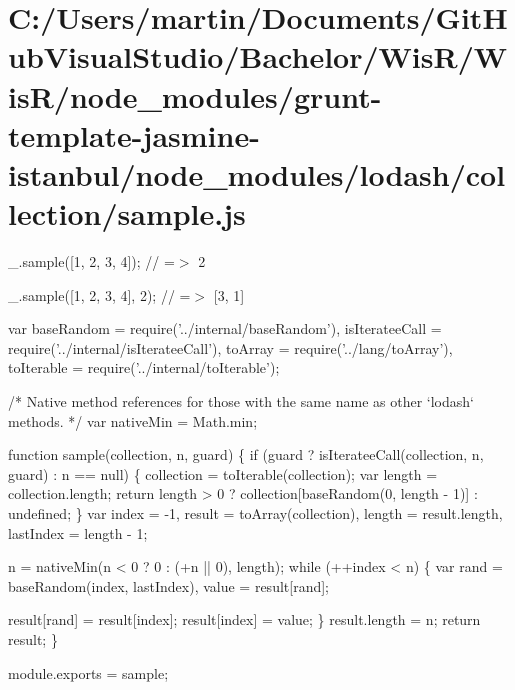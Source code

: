 \hypertarget{_c_1_2_users_2martin_2_documents_2_git_hub_visual_studio_2_bachelor_2_wis_r_2_wis_r_2node_module976fb4be8c54e3aff4b4ab6829a9eef2}{}\section{C\+:/\+Users/martin/\+Documents/\+Git\+Hub\+Visual\+Studio/\+Bachelor/\+Wis\+R/\+Wis\+R/node\+\_\+modules/grunt-\/template-\/jasmine-\/istanbul/node\+\_\+modules/lodash/collection/sample.\+js}
\+\_\+.\+sample(\mbox{[}1, 2, 3, 4\mbox{]}); // =$>$ 2

\+\_\+.\+sample(\mbox{[}1, 2, 3, 4\mbox{]}, 2); // =$>$ \mbox{[}3, 1\mbox{]}


\begin{DoxyCodeInclude}
var baseRandom = require(\textcolor{stringliteral}{'../internal/baseRandom'}),
    isIterateeCall = require(\textcolor{stringliteral}{'../internal/isIterateeCall'}),
    toArray = require(\textcolor{stringliteral}{'../lang/toArray'}),
    toIterable = require(\textcolor{stringliteral}{'../internal/toIterable'});

\textcolor{comment}{/* Native method references for those with the same name as other `lodash` methods. */}
var nativeMin = Math.min;

\textcolor{keyword}{function} sample(collection, n, guard) \{
  \textcolor{keywordflow}{if} (guard ? isIterateeCall(collection, n, guard) : n == null) \{
    collection = toIterable(collection);
    var length = collection.length;
    \textcolor{keywordflow}{return} length > 0 ? collection[baseRandom(0, length - 1)] : undefined;
  \}
  var index = -1,
      result = toArray(collection),
      length = result.length,
      lastIndex = length - 1;

  n = nativeMin(n < 0 ? 0 : (+n || 0), length);
  \textcolor{keywordflow}{while} (++index < n) \{
    var rand = baseRandom(index, lastIndex),
        value = result[rand];

    result[rand] = result[index];
    result[index] = value;
  \}
  result.length = n;
  \textcolor{keywordflow}{return} result;
\}

module.exports = sample;
\end{DoxyCodeInclude}
 